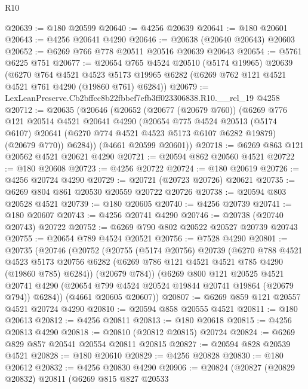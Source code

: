 \begin{lexlean}{R10}
\begin{coremodule}
@20639 := @180 @20599
@20640 := @4256 @20639
@20641 := @180 @20601
@20643 := @4256 @20641 @4290
@20646 := @20638 (@20640 @20643) @20603
@20652 := @6269 @766 @778 @20511 @20516 @20639 @20643
@20654 := @5761 @6225 @751
@20677 := @20654
    @765
    @4524
    @20510
    (@5174 @19965)
    @20639
    (@6270
      @764
      @4521
      @4523
      @5173
      @19965
      @6282
      (@6269 @762 @121 @4521 @4521 @761 @4290 (@19860 @761) @6284))
@20679 := LexLeanPreserve.Cb2bffcc8b22fbbef7efb3ff023306838.R10.__rel_19 @4258
@20712 := @20635
    (@20646
      (@20652
        (@20677 (@20679 @760))
        (@6269
          @776
          @121
          @20514
          @4521
          @20641
          @4290
          (@20654
            @775
            @4524
            @20513
            (@5174 @6107)
            @20641
            (@6270 @774 @4521 @4523 @5173 @6107 @6282 @19879)
            (@20679 @770))
          @6284))
      (@4661 @20599 @20601))
@20718 := @6269 @863 @121 @20562 @4521 @20621 @4290
@20721 := @20594 @862 @20560 @4521
@20722 := @180 @20608
@20723 := @4256 @20722
@20724 := @180 @20619
@20726 := @4256 @20724 @4290
@20729 := @20721 (@20723 @20726) @20621
@20735 := @6269 @804 @861 @20530 @20559 @20722 @20726
@20738 := @20594 @803 @20528 @4521
@20739 := @180 @20605
@20740 := @4256 @20739
@20741 := @180 @20607
@20743 := @4256 @20741 @4290
@20746 := @20738 (@20740 @20743) @20722
@20752 := @6269 @790 @802 @20522 @20527 @20739 @20743
@20755 := @20654 @789 @4524 @20521
@20756 := @7528 @4290
@20801 := @20735
    (@20746
      (@20752
        (@20755
          (@5174 @20756)
          @20739
          (@6270
            @788
            @4521
            @4523
            @5173
            @20756
            @6282
            (@6269 @786 @121 @4521 @4521 @785 @4290 (@19860 @785) @6284))
          (@20679 @784))
        (@6269
          @800
          @121
          @20525
          @4521
          @20741
          @4290
          (@20654 @799 @4524 @20524 @19844 @20741 @19864 (@20679 @794))
          @6284))
      (@4661 @20605 @20607))
@20807 := @6269 @859 @121 @20557 @4521 @20724 @4290
@20810 := @20594 @858 @20555 @4521
@20811 := @180 @20613
@20812 := @4256 @20811
@20813 := @180 @20618
@20815 := @4256 @20813 @4290
@20818 := @20810 (@20812 @20815) @20724
@20824 := @6269 @829 @857 @20541 @20554 @20811 @20815
@20827 := @20594 @828 @20539 @4521
@20828 := @180 @20610
@20829 := @4256 @20828
@20830 := @180 @20612
@20832 := @4256 @20830 @4290
@20906 := @20824
    (@20827
      (@20829 @20832)
      @20811
      (@6269
        @815
        @827
        @20533

\end{coremodule}
\end{lexlean}
